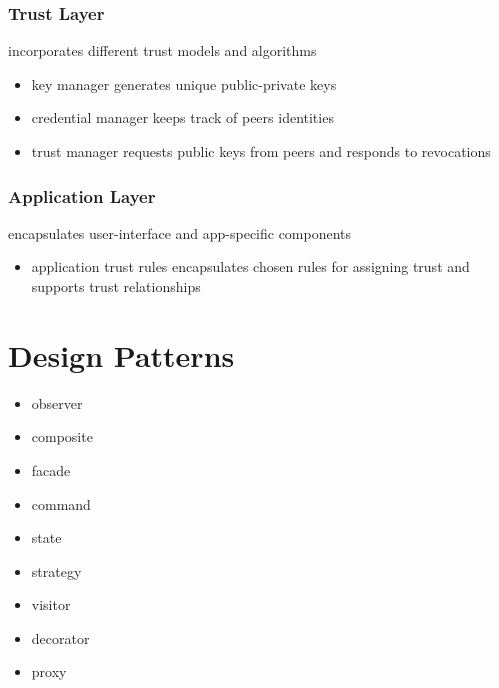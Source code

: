 \documentclass[]{article}
\theoremstyle{definition}
\begin{document}
	\subsubsection{Trust Layer}
	incorporates different trust models and algorithms
	\begin{itemize}
		\item key manager generates unique public-private keys
		\item credential manager keeps track of peers identities
		\item trust manager requests public keys from peers and responds to revocations
	\end{itemize}
	\subsubsection{Application Layer}
	encapsulates user-interface and app-specific components
	\begin{itemize}
		\item application trust rules encapsulates chosen rules for assigning trust and supports trust relationships
	\end{itemize}

	\section{Design Patterns}
	\begin{itemize}
		\item observer
		\item composite
		\item facade
		\item command
		\item state
		\item strategy
		\item visitor
		\item decorator
		\item proxy
	\end{itemize}
\end{document}
